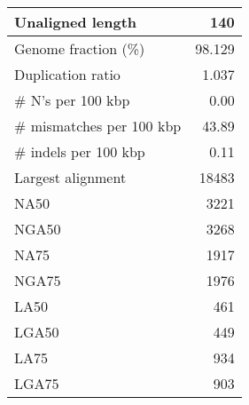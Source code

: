 \documentclass[12pt,a4paper]{article}
\begin{document}
\begin{table}[ht]
\begin{center}
\begin{tabular}{|l*{1}{|r}|}
Unaligned length & 140 \\ \hline
Genome fraction (\%) & 98.129 \\ \hline
Duplication ratio & 1.037 \\ \hline
\# N's per 100 kbp & 0.00 \\ \hline
\# mismatches per 100 kbp & 43.89 \\ \hline
\# indels per 100 kbp & 0.11 \\ \hline
Largest alignment & 18483 \\ \hline
NA50 & 3221 \\ \hline
NGA50 & 3268 \\ \hline
NA75 & 1917 \\ \hline
NGA75 & 1976 \\ \hline
LA50 & 461 \\ \hline
LGA50 & 449 \\ \hline
LA75 & 934 \\ \hline
LGA75 & 903 \\ \hline
\end{tabular}
\end{center}
\end{table}
\end{document}
